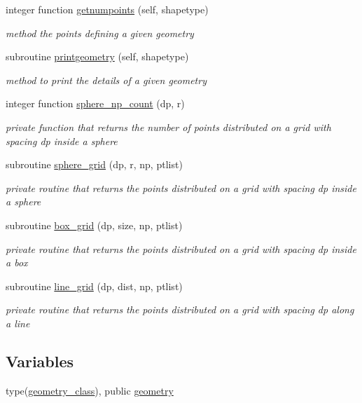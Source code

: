 \begin{DoxyCompactItemize}
integer function \mbox{\hyperlink{namespacegeometry__mod_a524c5d28a80fb6729b102126485605ce}{getnumpoints}} (self, shapetype)
\begin{DoxyCompactList}\small\item\em method the points defining a given geometry \end{DoxyCompactList}\item 
subroutine \mbox{\hyperlink{namespacegeometry__mod_aed4426181ca851b41717edd50268e5f3}{printgeometry}} (self, shapetype)
\begin{DoxyCompactList}\small\item\em method to print the details of a given geometry \end{DoxyCompactList}\item 
integer function \mbox{\hyperlink{namespacegeometry__mod_a05de7940b4e7df5a2b31f3d0414e3743}{sphere\+\_\+np\+\_\+count}} (dp, r)
\begin{DoxyCompactList}\small\item\em private function that returns the number of points distributed on a grid with spacing dp inside a sphere \end{DoxyCompactList}\item 
subroutine \mbox{\hyperlink{namespacegeometry__mod_a6c03a4ea3de6763940396dbeb3908ebc}{sphere\+\_\+grid}} (dp, r, np, ptlist)
\begin{DoxyCompactList}\small\item\em private routine that returns the points distributed on a grid with spacing dp inside a sphere \end{DoxyCompactList}\item 
subroutine \mbox{\hyperlink{namespacegeometry__mod_ae87e4ecff2d21a839da2b82919b5fd0b}{box\+\_\+grid}} (dp, size, np, ptlist)
\begin{DoxyCompactList}\small\item\em private routine that returns the points distributed on a grid with spacing dp inside a box \end{DoxyCompactList}\item 
subroutine \mbox{\hyperlink{namespacegeometry__mod_abcb09c0f5274c27cb79b0dd009ed94b3}{line\+\_\+grid}} (dp, dist, np, ptlist)
\begin{DoxyCompactList}\small\item\em private routine that returns the points distributed on a grid with spacing dp along a line \end{DoxyCompactList}\end{DoxyCompactItemize}
\subsection*{Variables}
\begin{DoxyCompactItemize}
\item 
type(\mbox{\hyperlink{structgeometry__mod_1_1geometry__class}{geometry\+\_\+class}}), public \mbox{\hyperlink{namespacegeometry__mod_ad2ad4f7e1138beaad5f37d5c15b7b457}{geometry}}
\end{DoxyCompactItemize}


